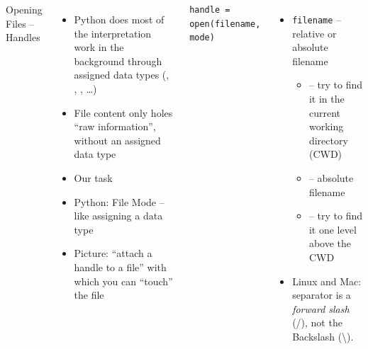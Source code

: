 
\begin{frame}[fragile]
%
\begin{columns}[T]
\begin{Large}
	{Opening Files -- Handles}
	\vspace{6pt}
\end{Large}
\begin{itemize}
\item Python does most of the interpretation work in the background through assigned data types (, , , \ldots)
\item File content only holes \enquote{raw information}, without an assigned data type
\item[\Thus] Our task
\item Python: File Mode -- like assigning a data type
\item Picture: \enquote{attach a handle to a file} with which you can \enquote{touch} the file
\end{itemize}
%
\begin{codebox}
\begin{verbatim}
handle = open(filename, mode)
\end{verbatim}
\end{codebox}
%
\begin{itemize}
\item \texttt{filename} -- relative or absolute filename
	\begin{itemize}
	\item {} -- try to find it in the current working directory (CWD)
	\item {} -- absolute filename
	\item {} -- try to find it one level above the CWD
	\end{itemize}
\item Linux and Mac: separator is a \emph{forward slash} (/), not the Backslash (\textbackslash).
\end{itemize}
\end{columns}
%
\end{frame}


